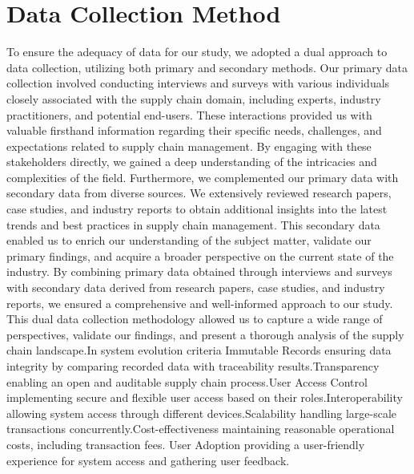 \section{Data Collection Method}
\noindent To ensure the adequacy of data for our study, we adopted a dual approach to data collection, utilizing both primary and secondary methods. Our primary data collection involved conducting interviews and surveys with various individuals closely associated with the supply chain domain, including experts, industry practitioners, and potential end-users. These interactions provided us with valuable firsthand information regarding their specific needs, challenges, and expectations related to supply chain management. By engaging with these stakeholders directly, we gained a deep understanding of the intricacies and complexities of the field.
Furthermore, we complemented our primary data with secondary data from diverse sources. We extensively reviewed research papers, case studies, and industry reports to obtain additional insights into the latest trends and best practices in supply chain management. This secondary data enabled us to enrich our understanding of the subject matter, validate our primary findings, and acquire a broader perspective on the current state of the industry.
By combining primary data obtained through interviews and surveys with secondary data derived from research papers, case studies, and industry reports, we ensured a comprehensive and well-informed approach to our study. This dual data collection methodology allowed us to capture a wide range of perspectives, validate our findings, and present a thorough analysis of the supply chain landscape.\cite{bib5}In system evolution criteria Immutable Records ensuring data integrity by comparing recorded data with traceability results.Transparency enabling an open and auditable supply chain process.User Access Control implementing secure and flexible user access based on their roles.Interoperability allowing system access through different devices.Scalability handling large-scale transactions concurrently.Cost-effectiveness maintaining reasonable operational costs, including transaction fees. User Adoption providing a user-friendly experience for system access and gathering user feedback.

